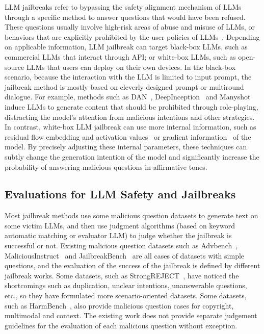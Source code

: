 LLM jailbreaks refer to bypassing the safety alignment mechanism of LLMs through a specific method to answer questions that would have been refused. These questions usually involve high-risk areas of abuse and misuse of LLMs, or behaviors that are explicitly prohibited by the user policies of LLMs~\cite{OpenAI_Usage_Policies_2025,Anthropic_Usage_Policy_2024,Meta_Llama_Model_Use_Policy}. Depending on applicable information, LLM jailbreak can target black-box LLMs, such as commercial LLMs that interact through API; or white-box LLMs, such as open-source LLMs that users can deploy on their own devices. In the black-box scenario, because the interaction with the LLM is limited to input prompt, the jailbreak method is mostly based on cleverly designed prompt or multiround dialogue. For example, methods such as DAN~\cite{shen2023anything}, DeepInception~\cite{li2023deepinception} and Manyshot~\cite{manyshot} induce LLMs to generate content that should be prohibited through role-playing, distracting the model's attention from malicious intentions and other strategies. In contrast, white-box LLM jailbreak can use more internal information, such as residual flow embedding and activation values~\cite{Xu2024uncovering, turner2023activation} or gradient information~\cite{23gcg, 24autodan} of the model. By precisely adjusting these internal parameters, these techniques can subtly change the generation intention of the model and significantly increase the probability of answering malicious questions in affirmative tones.

\subsection*{Evaluations for LLM Safety and Jailbreaks}

Most jailbreak methods use some malicious question datasets to generate text on some victim LLMs, and then use judgment algorithms (based on keyword automatic matching or evaluator LLM) to judge whether the jailbreak is successful or not. Existing malicious question datasets such as Advbench~\cite{chen2022adversarial}, MaliciousInstruct~\cite{huang2023catastrophic} and JailbreakBench~\cite{chao2024jailbreakbench} are all cases of datasets with simple questions, and the evaluation of the success of the jailbreak is defined by different jailbreak works. Some datasets, such as StrongREJECT~\cite{souly2024strongreject}, have noticed the shortcomings such as duplication, unclear intentions, unanswerable questions, etc., so they have formulated more scenario-oriented datasets. Some datasets, such as HarmBench~\cite{mazeika2024harmbench}, also provide malicious question cases for copyright, multimodal and context. The existing work does not provide separate judgement guidelines for the evaluation of each malicious question without exception.
